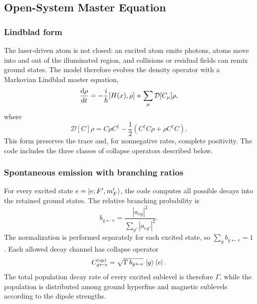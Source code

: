 \subsection{Open-System Master Equation}
\label{subsec:dm_master_equation}

\subsubsection{Lindblad form}

The laser-driven atom is not closed: an excited atom emits photons, atoms
move into and out of the illuminated region, and collisions or residual
fields can remix ground states.  The model therefore evolves the density
operator with a Markovian Lindblad master equation,
\begin{equation}
\frac{\mathrm{d}\rho}{\mathrm{d}t}
=
-\frac{i}{\hbar}[H(x),\rho]
+
\sum_{\mu}
\mathcal{D}[C_\mu]\rho,
\label{eq:dm_lindblad_master}
\end{equation}
where
\begin{equation}
\mathcal{D}[C]\rho
=
C\rho C^\dagger
-\frac{1}{2}
\left(
C^\dagger C\rho+\rho C^\dagger C
\right).
\label{eq:lindblad_dissipator}
\end{equation}
This form preserves the trace and, for nonnegative rates, complete
positivity.  The code includes the three classes of collapse operators
described below.

\subsubsection{Spontaneous emission with branching ratios}

For every excited state \(e=\left|e;F',m_F'\right\rangle\), the code computes all possible
decays into the retained ground states.  The relative branching probability
is
\begin{equation}
b_{g\leftarrow e}
=
\frac{|a_{eg}|^2}
{\displaystyle\sum_{g'}|a_{eg'}|^2}.
\label{eq:branching_ratio}
\end{equation}
The normalization is performed separately for each excited state, so
\(\sum_g b_{g\leftarrow e}=1\).  Each allowed decay channel has collapse
operator
\begin{equation}
C_{g\leftarrow e}^{(\mathrm{sp})}
=
\sqrt{\Gamma\,b_{g\leftarrow e}}\,
\left|g\right\rangle\left\langle e\right|.
\label{eq:spontaneous_collapse}
\end{equation}
The total population decay rate of every excited sublevel is therefore
\(\Gamma\), while the population is distributed among ground hyperfine and
magnetic sublevels according to the dipole strengths.

